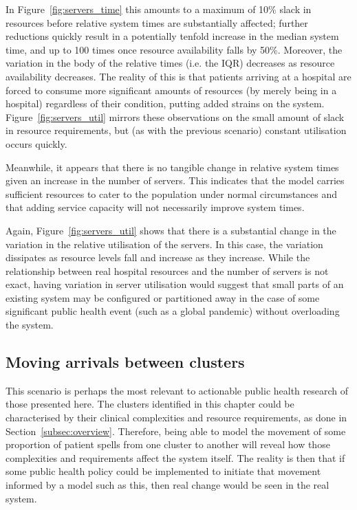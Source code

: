 In Figure~\ref{fig:servers_time} this amounts to a maximum of 10\% slack in
resources before relative system times are substantially affected; further
reductions quickly result in a potentially tenfold increase in the median system
time, and up to 100 times once resource availability falls by 50\%. Moreover,
the variation in the body of the relative times (i.e. the IQR) decreases as
resource availability decreases. The reality of this is that patients arriving
at a hospital are forced to consume more significant amounts of resources (by
merely being in a hospital) regardless of their condition, putting added strains
on the system. Figure~\ref{fig:servers_util} mirrors these observations on the
small amount of slack in resource requirements, but (as with the previous
scenario) constant utilisation occurs quickly.

Meanwhile, it appears that there is no tangible change in relative system times
given an increase in the number of servers. This indicates that the model
carries sufficient resources to cater to the population under normal
circumstances and that adding service capacity will not necessarily improve
system times.

Again, Figure~\ref{fig:servers_util} shows that there is a substantial change in
the variation in the relative utilisation of the servers. In this case, the
variation dissipates as resource levels fall and increase as they increase.
While the relationship between real hospital resources and the number of servers
is not exact, having variation in server utilisation would suggest that small
parts of an existing system may be configured or partitioned away in the case of
some significant public health event (such as a global pandemic) without
overloading the system.


\subsection{Moving arrivals between clusters}\label{subsec:moving}

This scenario is perhaps the most relevant to actionable public health research
of those presented here. The clusters identified in this chapter could be
characterised by their clinical complexities and resource requirements, as done
in Section~\ref{subsec:overview}. Therefore, being able to model the movement of
some proportion of patient spells from one cluster to another will reveal how
those complexities and requirements affect the system itself. The reality is
then that if some public health policy could be implemented to initiate that
movement informed by a model such as this, then real change would be seen in the
real system.

